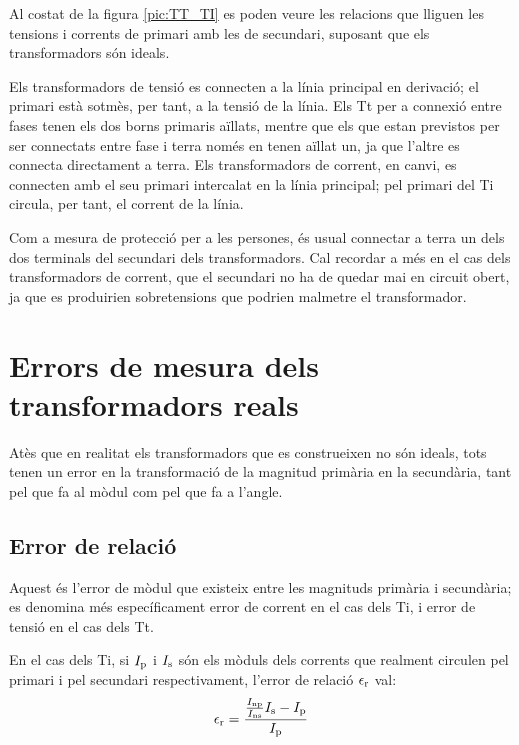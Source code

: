 Al costat de la figura
\vref{pic:TT_TI} es poden veure les relacions que lliguen les
tensions i corrents de primari amb les de secundari, suposant que
els transformadors són ideals.


Els transformadors de tensió es connecten a la línia principal en
derivació; el  primari està sotmès, per tant, a la tensió de la
línia. Els Tt per a connexió entre fases tenen els dos borns
primaris aïllats, mentre que els que estan previstos per ser
connectats entre fase i terra només en tenen aïllat un, ja que
l'altre es connecta directament a terra. Els transformadors de
corrent, en canvi, es connecten amb el seu primari intercalat en la
línia principal;  pel primari del Ti circula, per tant, el corrent
 de la línia.

 Com a mesura de protecció per a les persones, és usual
connectar a terra un dels dos terminals del secundari dels
transformadors. Cal recordar a més en el cas dels transformadors de
corrent, que el secundari no ha de quedar mai en circuit obert, ja
que es produirien sobretensions que podrien malmetre el
transformador.

\section{Errors de mesura dels transformadors reals}

Atès que en realitat els transformadors que es construeixen no són
ideals, tots tenen un error en la transformació de la magnitud
primària en la secundària, tant pel que fa al mòdul com pel que fa
a l'angle.

\subsection{Error de relació}

Aquest és l'error de mòdul que existeix entre les magnituds primària i
secundària; es denomina més específicament error de corrent en el
cas dels Ti, i error de tensió en el cas dels Tt.

En el cas dels Ti, si $I_\mathrm{p}$ i $I_\mathrm{s}$ són els mòduls dels corrents que
realment circulen pel primari i pel secundari respectivament,
l'error de relació $\epsilon_\mathrm{r}$ val:
\begin{equation}
    \epsilon_\mathrm{r} = \frac{\frac{I_\mathrm{np}}{I_\mathrm{ns}} I_\mathrm{s} - I_\mathrm{p}} {I_\mathrm{p}}
\end{equation}

